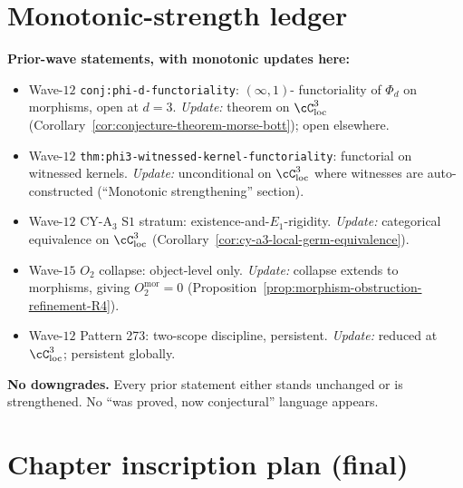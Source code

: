 \section*{Monotonic-strength ledger}

\noindent\textbf{Prior-wave statements, with monotonic updates here:}
\begin{itemize}
 \item Wave-$12$ \texttt{conj:phi-d-functoriality}: $(\infty,1)$-
       functoriality of $\Phi_d$ on morphisms, open at $d = 3$.
       \emph{Update:} theorem on $\cC_{\mathrm{loc}}^3$
       (Corollary~\ref{cor:conjecture-theorem-morse-bott}); open
       elsewhere.
 \item Wave-$12$ \texttt{thm:phi3-witnessed-kernel-functoriality}:
       functorial on witnessed kernels.  \emph{Update:} unconditional
       on $\cC_{\mathrm{loc}}^3$ where witnesses are auto-constructed
       (``Monotonic strengthening'' section).
 \item Wave-$12$ CY-A$_3$ S$1$ stratum: existence-and-$E_1$-rigidity.
       \emph{Update:} categorical equivalence on
       $\cC_{\mathrm{loc}}^3$
       (Corollary~\ref{cor:cy-a3-local-germ-equivalence}).
 \item Wave-$15$ $O_2$ collapse: object-level only.  \emph{Update:}
       collapse extends to morphisms, giving
       $O_2^{\mathrm{mor}} = 0$
       (Proposition~\ref{prop:morphism-obstruction-refinement-R4}).
 \item Wave-$12$ Pattern 273: two-scope discipline, persistent.
       \emph{Update:} reduced at $\cC_{\mathrm{loc}}^3$; persistent
       globally.
\end{itemize}

\noindent\textbf{No downgrades.}  Every prior statement either stands
unchanged or is strengthened.  No ``was proved, now conjectural''
language appears.

\section*{Chapter inscription plan (final)}

